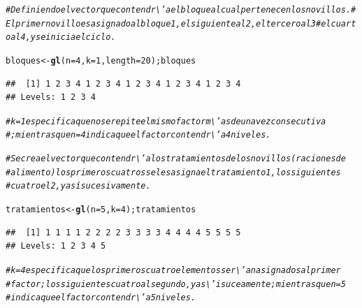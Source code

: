 \documentclass[12pt,letterpaper]{article}\usepackage[]{graphicx}\usepackage[]{color}
\makeatletter
\newcommand{\hlnum}[1]{\textcolor[rgb]{0.686,0.059,0.569}{#1}}%
\newcommand{\hlcom}[1]{\textcolor[rgb]{0.678,0.584,0.686}{\textit{#1}}}%
\newcommand{\hlstd}[1]{\textcolor[rgb]{0.345,0.345,0.345}{#1}}%
\newcommand{\hlkwb}[1]{\textcolor[rgb]{0.69,0.353,0.396}{#1}}%
\newcommand{\hlkwc}[1]{\textcolor[rgb]{0.333,0.667,0.333}{#1}}%
\newcommand{\hlkwd}[1]{\textcolor[rgb]{0.737,0.353,0.396}{\textbf{#1}}}%
\newenvironment{kframe}{%
 \def\at@end@of@kframe{}%
 \ifinner\ifhmode%
  \def\at@end@of@kframe{\end{minipage}}%
  \begin{minipage}{\columnwidth}%
 \fi\fi%
 \def\FrameCommand##1{\hskip\@totalleftmargin \hskip-\fboxsep
 \colorbox{shadecolor}{##1}\hskip-\fboxsep
     \hskip-\linewidth \hskip-\@totalleftmargin \hskip\columnwidth}%
 \MakeFramed {\advance\hsize-\width
   \@totalleftmargin\z@ \linewidth\hsize
   \@setminipage}}%
 {\par\unskip\endMakeFramed%
 \at@end@of@kframe}
\newenvironment{knitrout}{}{} %
\makeatother
\begin{document}
\begin{knitrout}
\color{fgcolor}\begin{kframe}
\begin{alltt}
\hlcom{# Definiendo el vector que contendr\textbackslash{}'a el bloque al cual pertenecen los novillos. # El primer novillo es asignado al bloque 1, el siguiente al 2, el tercero al 3 # el cuartoal 4, y se inicia el ciclo.}

\hlstd{bloques} \hlkwb{<-} \hlkwd{gl}\hlstd{(}\hlkwc{n}\hlstd{=}\hlnum{4}\hlstd{,} \hlkwc{k}\hlstd{=}\hlnum{1}\hlstd{,} \hlkwc{length}\hlstd{=}\hlnum{20}\hlstd{);bloques}
\end{alltt}
\begin{verbatim}
##  [1] 1 2 3 4 1 2 3 4 1 2 3 4 1 2 3 4 1 2 3 4
## Levels: 1 2 3 4
\end{verbatim}
\begin{alltt}
\hlcom{# k=1 especifica que no se repite el mismo factor m\textbackslash{}'as de una vez consecutiva}
\hlcom{# ;mientras que n=4 indica que el factor contendr\textbackslash{}'a 4 niveles. }

\hlcom{# Se crea el vector que contendr\textbackslash{}'a los tratamientos de los novillos (raciones de}
\hlcom{# alimento) los primeros cuatros se les asigna el tratamiento 1, los siguientes}
\hlcom{# cuatro el 2, y así sucesivamente. }

\hlstd{tratamientos} \hlkwb{<-} \hlkwd{gl}\hlstd{(}\hlkwc{n}\hlstd{=}\hlnum{5}\hlstd{,} \hlkwc{k}\hlstd{=}\hlnum{4}\hlstd{);tratamientos}
\end{alltt}
\begin{verbatim}
##  [1] 1 1 1 1 2 2 2 2 3 3 3 3 4 4 4 4 5 5 5 5
## Levels: 1 2 3 4 5
\end{verbatim}
\begin{alltt}
\hlcom{# k=4 especifica que los primeros cuatro elementos ser\textbackslash{}'an asignados al primer }
\hlcom{# factor; los siguientes cuatro al segundo, y as\textbackslash{}'i suceamente; mientras que n=5}
\hlcom{# indica que el factor contendr\textbackslash{}'a 5 niveles.}


\end{alltt}
\end{kframe}
\end{knitrout}
\end{document}
